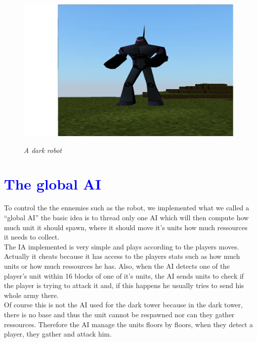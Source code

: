 \documentclass[article]{report}             %
\begin{document}
					\begin{figure}[h]
								\includegraphics[width=15cm]{images/DarkRobot.png}
								\begin{center}\it A dark robot\end{center}
							\end{figure}
		
		\chapter{\textcolor{blue}{The global AI}}
				To control the the ennemies such as the robot, we implemented what we called a ``global AI'' the basic idea is to thread only one AI which will then compute how much unit it should spawn, where it should move it's units how much ressources it needs to collect.\\

				The IA implemented is very simple and plays according to the players moves. Actually it cheats because it has access to the players stats such as how much units or how much ressources he has. Also, when the AI detects one of the player's unit within 16 blocks of one of it's units, the AI sends units to check if the player is trying to attack it and, if this happens he usually tries to send his whole army there.\\

				Of course this is not the AI used for the dark tower because in the dark tower, there is no base and thus the unit cannot be respawned nor can they gather ressources. Therefore the AI manage the units floors by floors, when they detect a player, they gather and attack him.
\end{document}
